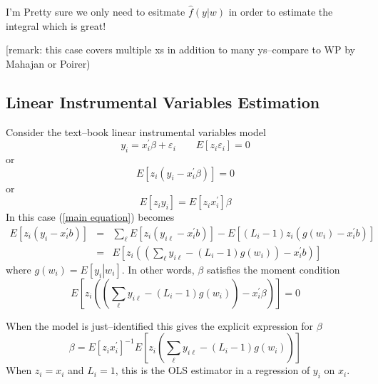 \documentclass[12pt]{article}
\begin{document}
I'm Pretty sure we only need to esitmate $\hat{f}(y | w) $ in order to estimate the integral which is great! 


[remark: this case covers multiple xs in addition to many ys--compare to WP
by Mahajan or Poirer)

\subsection{Linear Instrumental Variables Estimation\label{Lin IV}}

Consider the text--book linear instrumental variables model
\begin{equation*}
y_{i}=x_{i}^{\prime }\beta +\varepsilon _{i}\qquad E\left[ z_{i}\varepsilon
_{i}\right] =0
\end{equation*}%
or%
\begin{equation}
E\left[ z_{i}\left( y_{i}-x_{i}^{\prime }\beta \right) \right] =0
\label{moment condition}
\end{equation}%
or%
\begin{equation*}
E\left[ z_{i}y_{i}\right] =E\left[ z_{i}x_{i}^{\prime }\right] \beta
\end{equation*}%
In this case (\ref{main equation}) becomes%
\begin{eqnarray*}
E\left[ z_{i}\left( y_{i}-x_{i}^{\prime }b\right) \right] &=&\sum_{\ell }E%
\left[ z_{i}\left( y_{i\ell }-x_{i}^{\prime }b\right) \right] -E\left[
\left( L_{i}-1\right) z_{i}\left( g\left( w_{i}\right) -x_{i}^{\prime
}b\right) \right] \\
&=&E\left[ z_{i}\left( \left( \sum_{\ell }y_{i\ell }-\left( L_{i}-1\right)
g\left( w_{i}\right) \right) -x_{i}^{\prime }b\right) \right]
\end{eqnarray*}%
where $g\left( w_{i}\right) =E\left[ \left. y_{i}\right\vert w_{i}\right] $.
In other words, $\beta $ satisfies the moment condition
\begin{equation}
E\left[ z_{i}\left( \left( \sum_{\ell }y_{i\ell }-\left( L_{i}-1\right)
g\left( w_{i}\right) \right) -x_{i}^{\prime }\beta \right) \right] =0
\label{momcon1}
\end{equation}

When the model is just--identified this gives the explicit expression for $%
\beta $%
\begin{equation}
\beta =E\left[ z_{i}x_{i}^{\prime }\right] ^{-1}E\left[ z_{i}\left(
\sum_{\ell }y_{i\ell }-\left( L_{i}-1\right) g\left( w_{i}\right) \right) %
\right]  \label{est1}
\end{equation}%
When $z_{i}=x_{i}$ and $L_{i}=1$, this is the OLS estimator in a regression
of $y_{i}$ on $x_{i}$.
\end{document}
